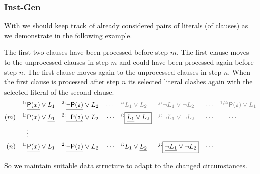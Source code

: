 \subsubsection{Inst-Gen}

With \InstGen{} we should keep track of already considered pairs of literals (of clauses) as we demonstrate in the following example.

\begin{example}[InstGen]
	The first two clauses have been processed before step \( m \).
	The first clause moves to the unprocessed clauses in step \( m \)
	and could have been processed again before step \( n \).
	The first clause moves again to the unprocessed clauses in step \( n \).
When the first clause is processed after step \(n \)
its selected literal clashes again with the selected literal of
the second clause.
\begin{align*}
	^{1:}&\underline{\mP(x)}\lor L_1
	&^{2:}&\underline{\lnot\mP(\ma)}\lor L_2
	&&\textcolor{colG}{\cdots}
	&\textcolor{colG}{^{i:}}&\textcolor{colG}{L_1\lor L_2}
	&\textcolor{colG}{^{j:}}&\textcolor{colG}{\lnot L_1\lor\lnot L_2}
	&&\textcolor{colG}{\cdots}
	&\textcolor{colG}{^{1,2:}}&\textcolor{colG}{\mP(\ma)\lor L_1}
	\\
	(m)\quad
	^{1:}&\mP(x)\lor \underline{L_1}
	&^{2:}&\underline{\lnot\mP(\ma)}\lor L_2
	&&\cdots
	&^{i:}&\boxed{\underline{L_1}\lor L_2}
	&\textcolor{colG}{^{j:}}&\textcolor{colG}{\lnot L_1\lor\lnot L_2}
	&&\textcolor{colG}{\cdots}
	&&\textcolor{colG}{\cdots}
	\\
	&\vdots
	\\
	(n)\quad
	^{1:}&\underline{\mP(x)}\lor {L_1} &
	^{2:}&\underline{\lnot\mP(\ma)}\lor L_2 &
	&\cdots&
	^{i:}&{L_1}\lor \underline{L_2} &
	^{j:}&\boxed{\underline{\lnot L_1}\lor \lnot L_2} &
	&\textcolor{colG}{\cdots}
\end{align*}
\end{example}

\noindent
So we maintain suitable data structure to adapt to the changed circumstances.

